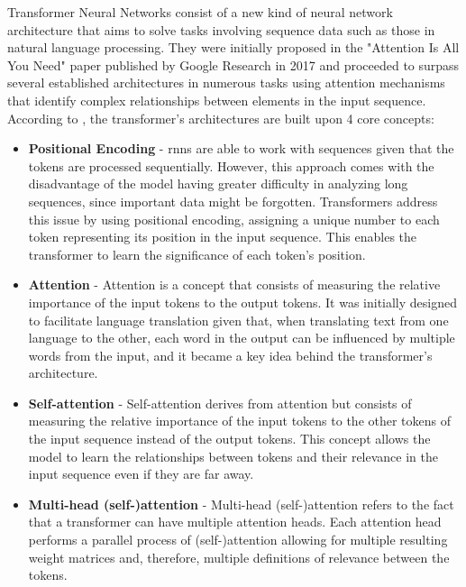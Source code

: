 Transformer Neural Networks consist of a new kind of neural network architecture that aims to solve tasks involving sequence data such as those in natural language processing. They were initially proposed in the "Attention Is All You Need" paper published by Google Research in 2017 \cite{Vaswani2017} and proceeded to surpass several established architectures in numerous tasks using attention mechanisms that identify complex relationships between elements in the input sequence. According to \textcite{Transformer_Oreilly}, the transformer's architectures are built upon 4 core concepts: %
\begin{itemize}
    \item \textbf{Positional Encoding} - \acs{rnn}s are able to work with sequences given that the tokens are processed sequentially. However, this approach comes with the disadvantage of the model having greater difficulty in analyzing long sequences, since important data might be forgotten. Transformers address this issue by using positional encoding, assigning a unique number to each token representing its position in the input sequence. This enables the transformer to learn the significance of each token's position.
    
    \item \textbf{Attention} - Attention is a concept that consists of measuring the relative importance of the input tokens to the output tokens. It was initially designed to facilitate language translation given that, when translating text from one language to the other, each word in the output can be influenced by multiple words from the input, and it became a key idea behind the transformer's architecture.

    \item \textbf{Self-attention} - Self-attention derives from attention but consists of measuring the relative importance of the input tokens to the other tokens of the input sequence instead of the output tokens. This concept allows the model to learn the relationships between tokens and their relevance in the input sequence even if they are far away.

    \item \textbf{Multi-head (self-)attention} - Multi-head (self-)attention refers to the fact that a transformer can have multiple attention heads. Each attention head performs a parallel process of (self-)attention allowing for multiple resulting weight matrices and, therefore, multiple definitions of relevance between the tokens.
\end{itemize}

